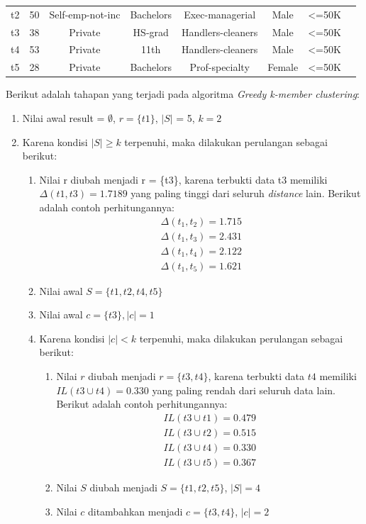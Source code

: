 \documentclass[a4paper,twoside]{article}
\begin{document}
\begin{enumerate}
\begin{table}[H]
\begin{tabular}{c c c c c c c c}
t2 & 50 & Self-emp-not-inc & Bachelors & Exec-managerial & Male & <=50K  \\ 

t3 & 38 & Private & HS-grad & Handlers-cleaners & Male & <=50K  \\ 

t4 & 53 & Private & 11th & Handlers-cleaners & Male & <=50K  \\ 
 
t5 & 28 & Private & Bachelors & Prof-specialty & Female & <=50K	 \\ 
\hline 
\end{tabular} 
\label{table:adults}
\end{table}

\noindent Berikut adalah tahapan yang terjadi pada algoritma \textit{Greedy k-member clustering}:

\begin{enumerate}
\item Nilai awal result = $\emptyset$, $r = \{t1\}$, $|S|$ = 5, $k = 2$
\item Karena kondisi $|S| \geq k$ terpenuhi, maka dilakukan perulangan sebagai berikut:
\begin{enumerate}
\item Nilai r diubah menjadi r = \{t3\}, karena terbukti data t3 memiliki $\Delta(t1,t3)=1.7189$ yang paling tinggi dari seluruh \textit{distance} lain. Berikut adalah contoh perhitungannya:
\begin{align*}
\Delta (t_1,t_2) = 1.715\\
\Delta (t_1,t_3) = 2.431\\
\Delta (t_1,t_4) = 2.122\\
\Delta (t_1,t_5) = 1.621 
\end{align*}
\item Nilai awal $S = \{t1, t2, t4, t5\}$
\item Nilai awal $c = \{t3\}, |c| = 1$
\item Karena kondisi $|c| < k$ terpenuhi, maka dilakukan perulangan sebagai berikut:

\begin{enumerate}
\item Nilai $r$ diubah menjadi $r = \{t3,t4\}$, karena terbukti data $t4$ memiliki $IL(t3 \cup t4)=0.330$ yang paling rendah dari seluruh data lain. Berikut adalah contoh perhitungannya:
\begin{align*}
IL(t3 \cup t1) = 0.479 \\
IL(t3 \cup t2) = 0.515 \\
IL(t3 \cup t4) = 0.330 \\
IL(t3 \cup t5) = 0.367 
\end{align*}
\item Nilai $S$ diubah menjadi $S = \{t1, t2, t5\}$, $|S| = 4$
\item Nilai $c$ ditambahkan menjadi $c = \{t3, t4\}$, $|c| = 2$


\end{enumerate}
\end{enumerate}
\end{enumerate}
\end{enumerate}
\end{document}
